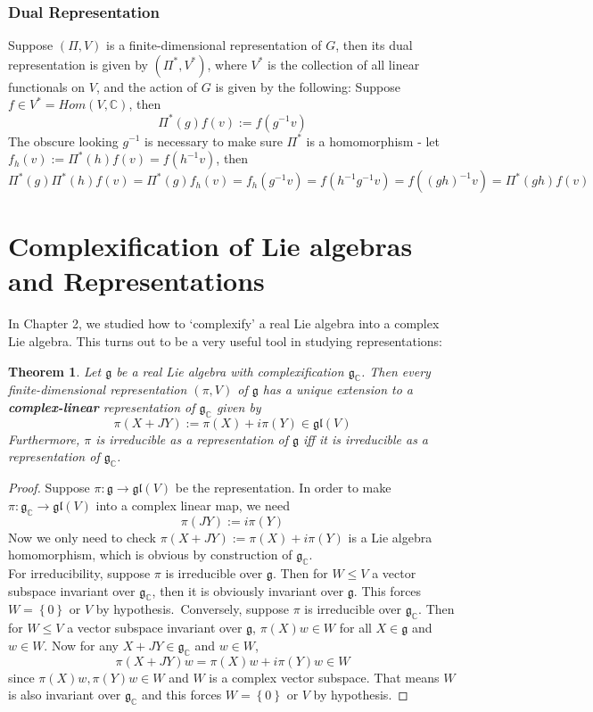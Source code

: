 \documentclass[11pt]{book}
\newtheorem{theorem}{Theorem}[section]
\newcommand{\bb}[1]{\mathbb{#1}}
\newcommand{\mf}[1]{\mathfrak{#1}}
\begin{document}
\subsubsection{Dual Representation}
Suppose $(\Pi,V)$ is a finite-dimensional representation of $G$, then its dual representation is given by $(\Pi^*, V^*)$, where $V^*$ is the collection of all linear functionals on $V$, and the action of $G$ is given by the following: Suppose $f \in V^* = Hom(V,\bb{C})$, then
$$\Pi^*(g)f(v) := f(g^{-1}v)$$
The obscure looking $g^{-1}$ is necessary to make sure $\Pi^*$ is a homomorphism - let $f_h(v) := \Pi^*(h)f(v) = f(h^{-1}v)$, then
$$\Pi^*(g)\Pi^*(h)f(v) = \Pi^*(g)f_h(v) = f_h(g^{-1}v) = f(h^{-1}g^{-1}v) = f((gh)^{-1}v) = \Pi^*(gh)f(v)$$


\section{Complexification of Lie algebras and Representations} \label{complex}
In Chapter 2, we studied how to `complexify' a real Lie algebra into a complex Lie algebra. This turns out to be a very useful tool in studying representations:
\begin{theorem}
Let $\mf{g}$ be a real Lie algebra with complexification $\mf{g}_{\bb{C}}$. Then every finite-dimensional representation $(\pi,V)$ of $\mf{g}$ has a unique extension to a \textbf{complex-linear} representation of $\mf{g}_{\bb{C}}$ given by
$$\pi(X + JY) := \pi(X) + i\pi(Y) \in \mf{gl}(V)$$
Furthermore, $\pi$ is irreducible as a representation of $\mf{g}$ iff it is irreducible as a representation of $\mf{g}_{\bb{C}}$.
\end{theorem}
\begin{proof}
Suppose $\pi: \mf{g} \to \mf{gl}(V)$ be the representation. In order to make $\pi: \mf{g}_{\bb{C}} \to \mf{gl}(V)$ into a complex linear map, we need
$$\pi(JY) := i\pi(Y)$$
Now we only need to check $\pi(X+JY) := \pi(X) + i\pi(Y)$ is a Lie algebra homomorphism, which is obvious by construction of $\mf{g}_{\bb{C}}$.\\
For irreducibility, suppose $\pi$ is irreducible over $\mf{g}$. Then for $W \leq V$ a vector subspace invariant over $\mf{g}_{\bb{C}}$, then it is obviously invariant over $\mf{g}$. This forces $W = \left\{0\right\}$ or $V$ by hypothesis.\
Conversely, suppose $\pi$ is irreducible over $\mf{g}_{\bb{C}}$. Then for $W \leq V$ a vector subspace invariant over $\mf{g}$, $\pi(X)w \in W$ for all $X \in \mf{g}$ and $w \in W$. Now for any $X+ JY \in \mf{g}_{\bb{C}}$ and $w \in W$,
$$\pi(X+JY)w = \pi(X)w + i\pi(Y)w \in W$$
since $\pi(X)w, \pi(Y)w \in W$ and $W$ is a complex vector subspace. That means $W$ is also invariant over $\mf{g}_{\bb{C}}$ and this forces $W = \left\{0\right\}$ or $V$ by hypothesis.
\end{proof}
\end{document}
